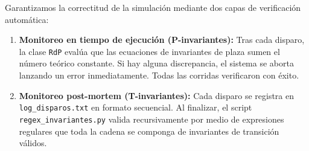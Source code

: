 \documentclass[12pt,a4paper]{article}
\begin{document}
Garantizamos la correctitud de la simulación mediante dos capas de verificación automática:
\begin{enumerate}
    \item \textbf{Monitoreo en tiempo de ejecución (P-invariantes):} Tras cada disparo, la clase \texttt{RdP} evalúa que las ecuaciones de invariantes de plaza sumen el número teórico constante. Si hay alguna discrepancia, el sistema se aborta lanzando un error inmediatamente. Todas las corridas verificaron con éxito.
    \item \textbf{Monitoreo post-mortem (T-invariantes):} Cada disparo se registra en \texttt{log\_disparos.txt} en formato secuencial. Al finalizar, el script \texttt{regex\_invariantes.py} valida recursivamente por medio de expresiones regulares que toda la cadena se componga de invariantes de transición válidos.
\end{enumerate}
\end{document}
